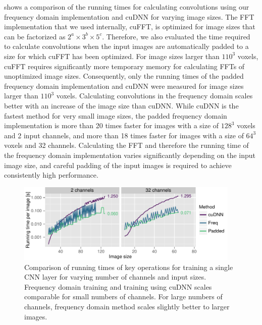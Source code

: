  shows a comparison of the running times for calculating
convolutions using our frequency domain implementation and cuDNN for varying
image sizes. The FFT implementation that we used internally, cuFFT, is optimized
for image sizes that can be factorized as $2^a\times3^b\times5^c$. Therefore, we
also evaluated the time required to calculate convolutions when the input images
are automatically padded to a size for which cuFFT has been optimized. For image
sizes larger than $110^3$ voxels, cuFFT requires significantly more temporary
memory for calculating FFTs of unoptimized image sizes. Consequently, only the
running times of the padded frequency domain implementation and cuDNN were
measured for image sizes larger than $110^3$ voxels. Calculating convolutions in
the frequency domain scales better with an increase of the image size than
cuDNN. While cuDNN is the fastest method for very small image sizes, the padded
frequency domain implementation is more than 20 times faster for images with a
size of $128^3$ voxels and 2 input channels, and more than 18 times faster for
images with a size of $64^3$ voxels and 32 channels. Calculating the FFT and
therefore the running time of the frequency domain implementation varies
significantly depending on the input image size, and careful padding of the
input images is required to achieve consistently high performance.


\begin{figure}
\centering
\includegraphics[width=0.95\textwidth]{figures/imagesize}
\caption[Comparison of running times of key operations for training a single
CNN layer.]{Comparison of running times of key operations for training a single
CNN layer for varying number of channels and input sizes. Frequency domain
training and training using cuDNN scales comparable for small numbers of
channels. For large numbers of channels, frequency domain method scales
slightly better to larger images.}
\label{fig:imagesize}
\end{figure}


